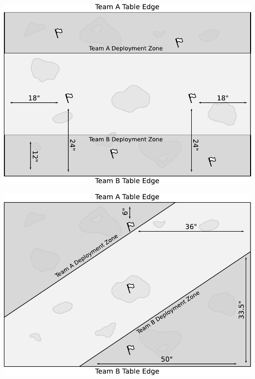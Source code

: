 \documentclass{40k}
\begin{document}
\bigskip\centerline{\includegraphics[scale=0.6]{maps/mission2}}


\bigskip\centerline{\includegraphics[scale=0.6]{maps/mission3}}









\end{document}
